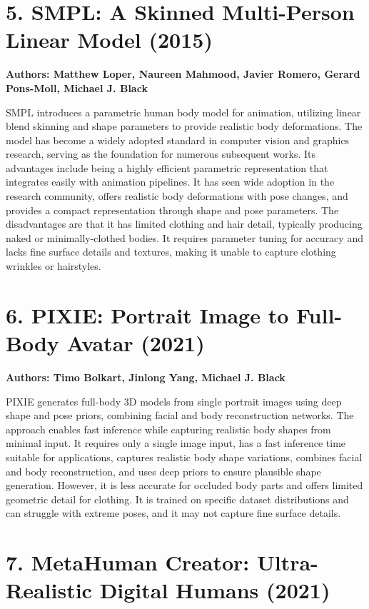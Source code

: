 \documentclass[12pt,a4paper,oneside]{report}
\begin{document}
\section*{5. SMPL: A Skinned Multi-Person Linear Model (2015)}

\textbf{Authors: Matthew Loper, Naureen Mahmood, Javier Romero, Gerard Pons-Moll, Michael J. Black}

SMPL introduces a parametric human body model for animation, utilizing linear blend skinning and shape parameters to provide realistic body deformations. The model has become a widely adopted standard in computer vision and graphics research, serving as the foundation for numerous subsequent works. Its advantages include being a highly efficient parametric representation that integrates easily with animation pipelines. It has seen wide adoption in the research community, offers realistic body deformations with pose changes, and provides a compact representation through shape and pose parameters. The disadvantages are that it has limited clothing and hair detail, typically producing naked or minimally-clothed bodies. It requires parameter tuning for accuracy and lacks fine surface details and textures, making it unable to capture clothing wrinkles or hairstyles.

\section*{6. PIXIE: Portrait Image to Full-Body Avatar (2021)}

\textbf{Authors: Timo Bolkart, Jinlong Yang, Michael J. Black}

PIXIE generates full-body 3D models from single portrait images using deep shape and pose priors, combining facial and body reconstruction networks. The approach enables fast inference while capturing realistic body shapes from minimal input. It requires only a single image input, has a fast inference time suitable for applications, captures realistic body shape variations, combines facial and body reconstruction, and uses deep priors to ensure plausible shape generation. However, it is less accurate for occluded body parts and offers limited geometric detail for clothing. It is trained on specific dataset distributions and can struggle with extreme poses, and it may not capture fine surface details.

\section*{7. MetaHuman Creator: Ultra-Realistic Digital Humans (2021)}
\end{document}
